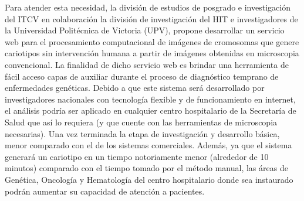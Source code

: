 \documentclass[12pt,letterpaper,titlepage]{article}
\begin{document}
Para atender esta necesidad, la división de estudios de posgrado e investigación del ITCV en colaboración la división de investigación del HIT e investigadores de la Universidad Politécnica de Victoria (UPV), propone desarrollar un servicio web para el procesamiento computacional de imágenes de cromosomas que genere cariotipos sin intervención humana a partir de imágenes obtenidas en microscopia convencional. La finalidad de dicho servicio web es brindar una herramienta de fácil acceso capas de auxiliar durante el proceso de diagnóstico temprano de enfermedades genéticas. Debido a que este sistema será desarrollado por investigadores nacionales con tecnología flexible y de funcionamiento en internet, el análisis podría ser aplicado en cualquier centro hospitalario de la Secretaría de Salud que así lo requiera (y que cuente con las herramientas de microscopia necesarias). Una vez terminada la etapa de investigación y desarrollo básica, menor comparado con el de los sistemas comerciales. Además, ya que el sistema generará un cariotipo en un tiempo notoriamente menor (alrededor de 10 minutos) comparado con el tiempo tomado por el método manual, las áreas de Genética, Oncología y Hematología del centro hospitalario donde sea instaurado podrán aumentar su capacidad de atención a pacientes. \\

\end{document}
